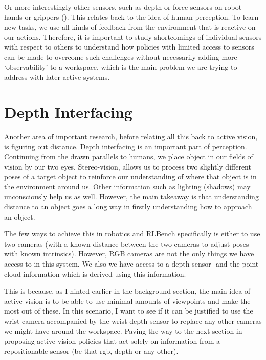 Or more interestingly other sensors, such as depth or force sensors on robot hands or grippers (). This relates back to the idea of human perception. To learn new tasks, we use all kinds of feedback from the environment that is reactive on our actions. Therefore, it is important to study shortcomings of individual sensors with respect to others to understand how policies with limited access to sensors can be made to overcome such challenges without necessarily adding more `observability' to a workspace, which is the main problem we are trying to address with later active systems.


\section{Depth Interfacing}
Another area of important research, before relating all this back to active vision, is figuring out distance. Depth interfacing is an important part of perception. Continuing from the drawn parallels to humans, we place object in our fields of vision by our two eyes. Stereo-vision, allows us to process two slightly different poses of a target object to reinforce our understanding of where that object is in the environment around us. Other information such as lighting (shadows) may unconsciously help us as well. However, the main takeaway is that understanding distance to an object goes a long way in firstly understanding how to approach an object.

The few ways to achieve this in robotics and RLBench specifically is either to use two cameras (with a known distance between the two cameras to adjust poses with known intrinsics). However, RGB cameras are not the only things we have access to in this system. We also we have access to a depth sensor -and the point cloud information which is derived using this information.

This is because, as I hinted earlier in the background section, the main idea of active vision is to be able to use minimal amounts of viewpoints and make the most out of these. In this scenario, I want to see if it can be justified to use the wrist camera accompanied by the wrist depth sensor to replace any other cameras we might have around the workspace. Paving the way to the next section in proposing active vision policies that act solely on information from a repositionable sensor (be that rgb, depth or any other).

